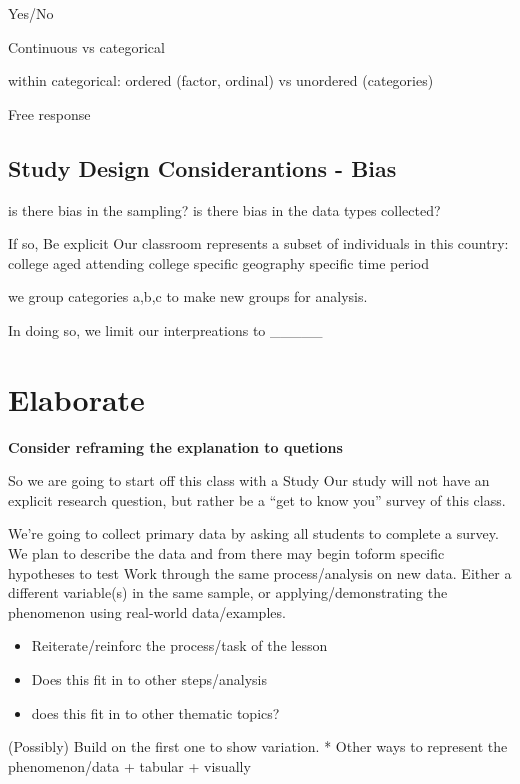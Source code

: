 \documentclass[
]{book}
\providecommand{\tightlist}{%
  \setlength{\itemsep}{0pt}\setlength{\parskip}{0pt}}
\begin{document}
Yes/No

Continuous vs categorical

within categorical:
ordered (factor, ordinal) vs unordered (categories)

Free response

\hypertarget{study-design-considerantions---bias}{%
\subsection{Study Design Considerantions - Bias}\label{study-design-considerantions---bias}}

is there bias in the sampling?
is there bias in the data types collected?

If so, Be explicit
Our classroom represents a subset of individuals in this country:
college aged
attending college
specific geography
specific time period

we group categories a,b,c to make new groups for analysis.

In doing so, we limit our interpreations to \_\_\_\_\_

\hypertarget{elaborate}{%
\section{Elaborate}\label{elaborate}}

\textbf{Consider reframing the explanation to quetions}

So we are going to start off this class with a Study
Our study will not have an explicit research question, but rather be a
``get to know you'' survey of this class.

We're going to collect primary data by asking all students to complete a survey.
We plan to describe the data and from there may begin toform specific hypotheses to test
Work through the same process/analysis on new data. Either a different
variable(s) in the same sample, or applying/demonstrating the phenomenon
using real-world data/examples.

\begin{itemize}
\tightlist
\item
  Reiterate/reinforc the process/task of the lesson
\item
  Does this fit in to other steps/analysis
\item
  does this fit in to other thematic topics?
\end{itemize}

(Possibly) Build on the first one to show variation.
* Other ways to represent the phenomenon/data
+ tabular
+ visually
\end{document}
